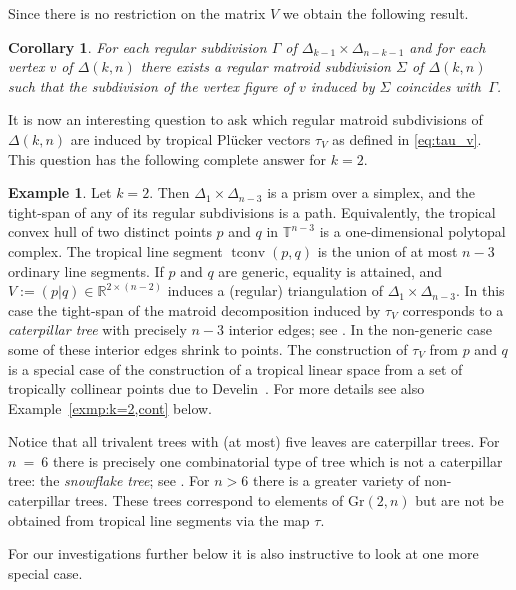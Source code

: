 \documentclass[11pt,a4paper]{amsart}
\newcommand{\RR}{{\mathbb{R}}}
\DeclareMathOperator{\tconv}{tconv}
\newcommand{\TT}{{\mathbb{T}}}
\newcommand{\Gr}[2]{{\mathrm{Gr}(#1,#2)}}
\theoremstyle{plain}
\newtheorem{corollary}[theorem]{Corollary}
\theoremstyle{definition}
\newtheorem{example}[theorem]{Example}
\begin{document}
Since there is no restriction on the matrix $V$ we obtain the following result.

\begin{corollary}
  For each regular subdivision $\Gamma$ of $\Delta_{k-1}\times\Delta_{n-k-1}$ and for each vertex
  $v$ of $\Delta(k,n)$ there exists a regular matroid subdivision $\Sigma$ of $\Delta(k,n)$ such that
  the subdivision of the vertex figure of $v$ induced by $\Sigma$ coincides with~$\Gamma$.
\end{corollary}

It is now an interesting question to ask which regular matroid subdivisions of $\Delta(k,n)$ are
induced by tropical Pl\"ucker vectors $\tau_V$ as defined in \eqref{eq:tau_v}.  This question has
the following complete answer for $k=2$.

\begin{example}\label{exmp:k=2}
  Let $k=2$.  Then $\Delta_1\times\Delta_{n-3}$ is a prism over a simplex, and the tight-span of any
  of its regular subdivisions is a path.  Equivalently, the tropical convex hull of two distinct
  points $p$ and $q$ in $\TT^{n-3}$ is a one-dimensional polytopal complex.  The tropical line
  segment $\tconv(p,q)$ is the union of at most $n-3$ ordinary line segments.  If $p$ and $q$ are
  generic, equality is attained, and $V:=(p|q)\in\RR^{2\times (n-2)}$ induces a (regular)
  triangulation of $\Delta_1\times\Delta_{n-3}$.  In this case the tight-span of the matroid
  decomposition induced by $\tau_V$ corresponds to a \emph{caterpillar tree} with precisely $n-3$
  interior edges; see \cite[Fig.~8 (left)]{MR2515769}.  In the non-generic case some of these
  interior edges shrink to points.  The construction of $\tau_V$ from $p$ and $q$ is a special case
  of the construction of a tropical linear space from a set of tropically collinear points due to
  Develin~\cite{MR2131129}.  For more details see also Example~\ref{exmp:k=2,cont} below.

  Notice that all trivalent trees with (at most) five leaves are caterpillar trees.  For
  $n~{=}~6$ there is precisely one combinatorial type of tree which is not a caterpillar tree: the
  \emph{snowflake tree}; see \cite[Fig.~8 (right)]{MR2515769}.  For $n>6$ there is a greater
  variety of non-caterpillar trees. These trees correspond to elements of $\Gr 2n$ but are not
  be obtained from tropical line segments via the map $\tau$.
\end{example}

For our investigations further below it is also instructive to look at one more special case.
\end{document}
